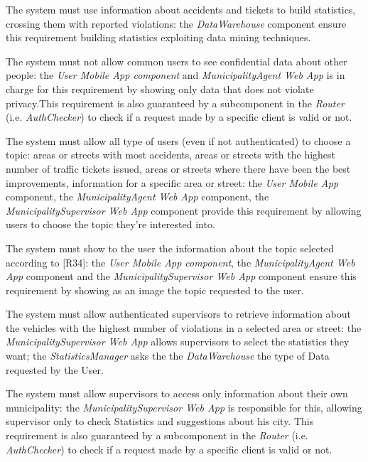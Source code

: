 \documentclass[a4paper]{report}
\begin{document}
\begin{enumerate}[start=1,label={[R\arabic*]}]
\item \label{[R32]}The system must use information  about accidents and tickets to build statistics, crossing them with reported violations: the \textit{DataWarehouse} component ensure this requirement building statistics exploiting data mining techniques.
\item \label{[R33]}The system must not allow common users to see confidential data about other people: the \textit{User Mobile App component} and \textit{MunicipalityAgent Web App} is in charge for this requirement by showing only data that does not violate privacy.This requirement is also guaranteed by a subcomponent in the \textit{Router} (i.e. \textit{AuthChecker}) to check if a request made by a specific client is valid or not.
\item \label{[R34]}The system must allow all type of users (even if not authenticated) to choose a topic: areas or streets with most accidents, areas or streets with the highest number of traffic tickets issued, areas or streets where there have been the best improvements, information for a specific area or street: the \textit{User Mobile App} component, the  \textit{MunicipalityAgent Web App} component, the \textit{MunicipalitySupervisor Web App} component provide this requirement by allowing users to choose the topic they're interested into.
\item \label{[R35]}The system must show to the user the information about the topic selected according to [R34]: the \textit{User Mobile App component}, the \textit{MunicipalityAgent Web App} component and the \textit{MunicipalitySupervisor Web App} component ensure this requirement by showing as an image the topic requested to the user.
\item \label{[R36]}The system must allow authenticated supervisors to retrieve information about the vehicles with the highest number of violations in a selected area or street: the \textit{MunicipalitySupervisor Web App} allows supervisors to select the statistics they want; the \textit{StatisticsManager} asks the the \textit{DataWarehouse} the type of Data requested by the User.
\item \label{[R37]}The system must allow supervisors to access only information about their own municipality: the \textit{MunicipalitySupervisor Web App} is responsible for this, allowing supervisor only to check Statistics and suggestions about his city. This requirement is also guaranteed by a subcomponent in the \textit{Router} (i.e. \textit{AuthChecker}) to check if a request made by a specific client is valid or not.

\end{enumerate}
\end{document}
